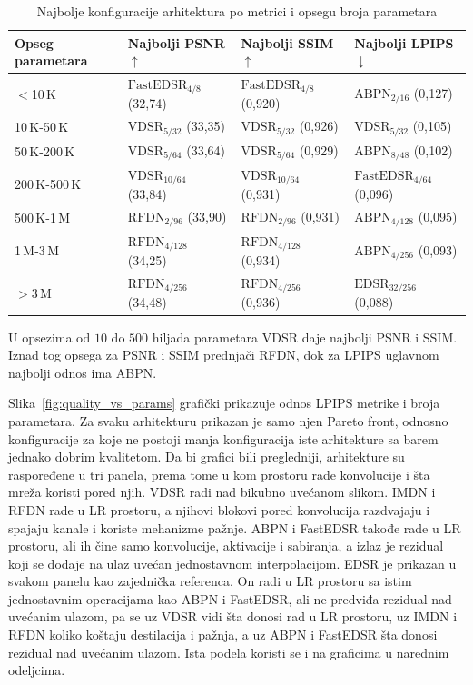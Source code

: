\documentclass[12pt,a4paper]{article}
\begin{document}
\begin{table}[H]
	\centering
	\small
	\setlength{\tabcolsep}{5pt}
	\begin{tabular}{@{}llll@{}}
		\toprule
		Opseg parametara & Najbolji PSNR $\uparrow$ & Najbolji SSIM $\uparrow$ & Najbolji LPIPS $\downarrow$ \\
		\midrule
		$<$10\,K & $\text{FastEDSR}_{\text{4/8}}$ (32,74) & $\text{FastEDSR}_{\text{4/8}}$ (0,920) & $\text{ABPN}_{\text{2/16}}$ (0,127) \\
		10\,K-50\,K & $\text{VDSR}_{\text{5/32}}$ (33,35) & $\text{VDSR}_{\text{5/32}}$ (0,926) & $\text{VDSR}_{\text{5/32}}$ (0,105) \\
		50\,K-200\,K & $\text{VDSR}_{\text{5/64}}$ (33,64) & $\text{VDSR}_{\text{5/64}}$ (0,929) & $\text{ABPN}_{\text{8/48}}$ (0,102) \\
		200\,K-500\,K & $\text{VDSR}_{\text{10/64}}$ (33,84) & $\text{VDSR}_{\text{10/64}}$ (0,931) & $\text{FastEDSR}_{\text{4/64}}$ (0,096) \\
		500\,K-1\,M & $\text{RFDN}_{\text{2/96}}$ (33,90) & $\text{RFDN}_{\text{2/96}}$ (0,931) & $\text{ABPN}_{\text{4/128}}$ (0,095) \\
		1\,M-3\,M & $\text{RFDN}_{\text{4/128}}$ (34,25) & $\text{RFDN}_{\text{4/128}}$ (0,934) & $\text{ABPN}_{\text{4/256}}$ (0,093) \\
		$>$3\,M & $\text{RFDN}_{\text{4/256}}$ (34,48) & $\text{RFDN}_{\text{4/256}}$ (0,936) & $\text{EDSR}_{\text{32/256}}$ (0,088) \\
		\bottomrule
	\end{tabular}
	\caption{Najbolje konfiguracije arhitektura po metrici i opsegu broja parametara}
	\label{tab:param_bins}
\end{table}

U opsezima od $10$ do $500$ hiljada parametara VDSR daje najbolji PSNR i SSIM. Iznad tog opsega za PSNR i SSIM prednjači RFDN, dok za LPIPS uglavnom najbolji odnos ima ABPN.

Slika~\ref{fig:quality_vs_params} grafički prikazuje odnos LPIPS metrike i broja parametara. Za svaku arhitekturu prikazan je samo njen Pareto front, odnosno konfiguracije za koje ne postoji manja konfiguracija iste arhitekture sa barem jednako dobrim kvalitetom. Da bi grafici bili pregledniji, arhitekture su raspoređene u tri panela, prema tome u kom prostoru rade konvolucije i šta mreža koristi pored njih. VDSR radi nad bikubno uvećanom slikom. IMDN i RFDN rade u LR prostoru, a njihovi blokovi pored konvolucija razdvajaju i spajaju kanale i koriste mehanizme pažnje. ABPN i FastEDSR takođe rade u LR prostoru, ali ih čine samo konvolucije, aktivacije i sabiranja, a izlaz je rezidual koji se dodaje na ulaz uvećan jednostavnom interpolacijom. EDSR je prikazan u svakom panelu kao zajednička referenca. On radi u LR prostoru sa istim jednostavnim operacijama kao ABPN i FastEDSR, ali ne predviđa rezidual nad uvećanim ulazom, pa se uz VDSR vidi šta donosi rad u LR prostoru, uz IMDN i RFDN koliko koštaju destilacija i pažnja, a uz ABPN i FastEDSR šta donosi rezidual nad uvećanim ulazom. Ista podela koristi se i na graficima u narednim odeljcima.
\end{document}
